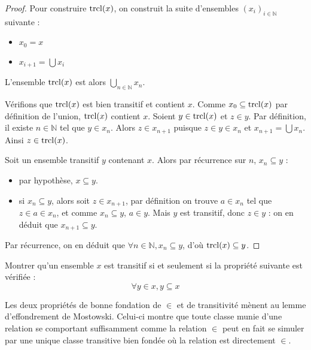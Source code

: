 \begin{proof}
  Pour construire $\operatorname{trcl}(x)$, on construit la suite d'ensembles
  $(x_i)_{i\in\mathbb N}$ suivante :
  \begin{itemize}
  \item $x_0 = x$
  \item $x_{i+1} = \bigcup x_i$
  \end{itemize}
  L'ensemble $\operatorname{trcl}(x)$ est alors $\displaystyle\bigcup_{n\in \mathbb N} x_n$.

  Vérifions que $\operatorname{trcl}(x)$ est bien transitif et contient $x$. Comme
  $x_0\subseteq \operatorname{trcl}(x)$ par définition de l'union, $\operatorname{trcl}(x)$ contient $x$.
  Soient $y\in \operatorname{trcl}(x)$ et $z\in y$. Par définition, il existe $n\in \mathbb N$
  tel que $y\in x_n$. Alors $z\in x_{n+1}$ puisque $z\in y \in x_n$ et
  $x_{n+1}=\bigcup x_n$. Ainsi $z\in \operatorname{trcl}(x)$.

  Soit un ensemble transitif $y$ contenant $x$. Alors par récurrence sur $n$,
  $x_n\subseteq y$ :
  \begin{itemize}
  \item par hypothèse, $x\subseteq y$.
  \item si $x_n\subseteq y$, alors soit $z\in x_{n+1}$, par définition on trouve
    $a\in x_n$ tel que $z\in a \in x_n$, et comme $x_n\subseteq y$, $a\in y$.
    Mais $y$ est transitif, donc $z\in y$ : on en déduit que
    $x_{n+1}\subseteq y$.
  \end{itemize}
  Par récurrence, on en déduit que $\forall n\in\mathbb N, x_n\subseteq y$,
  d'où $\operatorname{trcl}(x)\subseteq y$.
\end{proof}

\begin{exercise}
  Montrer qu'un ensemble $x$ est transitif si et seulement si la propriété
  suivante est vérifiée :
  \[\forall y\in x, y\subseteq x\]
\end{exercise}

Les deux propriétés de bonne fondation de $\in$ et de transitivité mènent au
lemme d'effondrement de Mostowski. Celui-ci montre que toute classe munie d'une
relation se comportant suffisamment comme la relation $\in$ peut en fait se
simuler par une unique classe transitive bien fondée où la relation est
directement $\in$.

